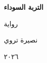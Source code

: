 \documentclass[14pt,a5paper]{book}
\begin{document}
\begin{titlepage}
\begin{center}
\vspace*{3cm}

{\Huge\bfseries التربة السوداء}

\vspace{1.5cm}

{\Large رواية}

\vspace{3cm}

{\large نصيرة تروي}

\vfill

{\small ٢٠٢٦}

\end{center}
\end{titlepage}

\thispagestyle{empty}
\cleardoublepage

\setcounter{page}{1}


\clearpage

\clearpage

\clearpage

\clearpage

\clearpage

\clearpage

\end{document}
